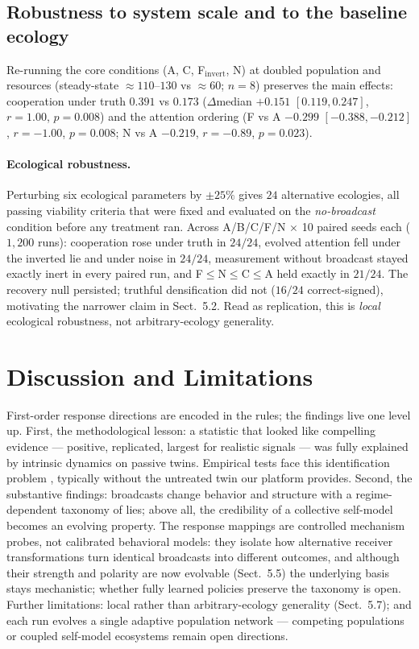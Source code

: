 \documentclass{svproc}
\begin{document}
\subsection{Robustness to system scale and to the baseline ecology}
Re-running the core conditions (A, C, F$_{\mathrm{invert}}$, N) at doubled
population and resources (steady-state $\approx 110$--$130$ vs $\approx 60$;
$n=8$) preserves the main effects: cooperation under truth $0.391$ vs
$0.173$ ($\Delta$median $+0.151$ $[0.119, 0.247]$, $r=1.00$, $p=0.008$) and
the attention ordering (F vs A $-0.299$ $[-0.388, -0.212]$, $r=-1.00$,
$p=0.008$; N vs A $-0.219$, $r=-0.89$, $p=0.023$).

\paragraph{Ecological robustness.} Perturbing six ecological parameters by
$\pm25\%$ gives $24$ alternative ecologies, all passing viability criteria that
were fixed and evaluated on the \emph{no-broadcast} condition before any
treatment ran. Across A/B/C/F/N $\times$ 10 paired seeds each ($1{,}200$ runs):
cooperation rose under truth in $24/24$, evolved attention fell under the
inverted lie and under noise in $24/24$, measurement without broadcast stayed
exactly inert in every paired run, and F$\leq$N$\leq$C$\leq$A held exactly in
$21/24$. The recovery null persisted; truthful densification did not ($16/24$
correct-signed), motivating the narrower claim in Sect.~5.2. Read as
replication, this is \emph{local} ecological robustness, not
arbitrary-ecology generality.

\section{Discussion and Limitations}
First-order response directions are encoded in the rules; the findings live
one level up. First, the methodological lesson: a statistic that looked like compelling
evidence --- positive, replicated, largest for realistic signals --- was fully
explained by intrinsic dynamics on passive twins. Empirical tests face this
identification problem \cite{cheng2024causal}, typically without the
untreated twin our platform provides. Second, the substantive findings:
broadcasts change behavior and structure with a regime-dependent taxonomy of
lies; above all, the credibility of a collective self-model becomes an
evolving property.
The response mappings are controlled mechanism probes, not calibrated
behavioral models: they isolate how alternative receiver transformations turn
identical broadcasts into different outcomes, and although their strength and
polarity are now evolvable (Sect.~5.5) the underlying basis stays mechanistic;
whether fully learned policies preserve the taxonomy is open. Further
limitations: local rather than arbitrary-ecology generality (Sect.~5.7); and
each run evolves a single adaptive population network --- competing
populations or coupled self-model ecosystems remain open directions.
\end{document}
